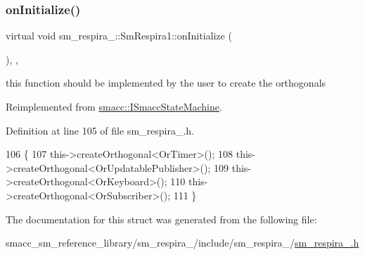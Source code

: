 \subsubsection{\texorpdfstring{on\+Initialize()}{onInitialize()}}
{\footnotesize\ttfamily virtual void sm\+\_\+respira\+\_\+::\+Sm\+Respira1\+::on\+Initialize (\begin{DoxyParamCaption}{ }\end{DoxyParamCaption})\hspace{0.3cm}{\ttfamily [inline]}, {\ttfamily [override]}, {\ttfamily [virtual]}}



this function should be implemented by the user to create the orthogonals 



Reimplemented from \hyperlink{classsmacc_1_1ISmaccStateMachine_ac2982c6c8283663e5e1e8a7c82f511ec}{smacc\+::\+I\+Smacc\+State\+Machine}.



Definition at line 105 of file sm\+\_\+respira\+\_.\+h.


\begin{DoxyCode}
106     \{
107         this->createOrthogonal<OrTimer>();
108         this->createOrthogonal<OrUpdatablePublisher>();
109         this->createOrthogonal<OrKeyboard>();
110         this->createOrthogonal<OrSubscriber>();
111     \}
\end{DoxyCode}


The documentation for this struct was generated from the following file\+:\begin{DoxyCompactItemize}
\item 
smacc\+\_\+sm\+\_\+reference\+\_\+library/sm\+\_\+respira\+\_/include/sm\+\_\+respira\+\_/\hyperlink{sm__respira__1_8h}{sm\+\_\+respira\+\_.\+h}\end{DoxyCompactItemize}
